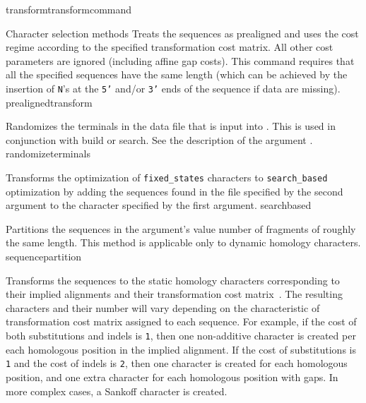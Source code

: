 \begin{command}{transform}{transformcommand}
\begin{arguments}
\begin{argumentgroup}{Character selection methods}
                {Treats the sequences as prealigned and uses the
                cost regime according to the specified transformation cost
                matrix. All other cost parameters are ignored (including affine
                gap costs). This command requires that all the specified sequences 
                have the same length (which can be achieved by the insertion of \texttt{N}'s
                at the \texttt{5'} and/or \texttt{3'} ends of the sequence if data are missing).}
                {prealignedtransform}
            
                {Randomizes the terminals in the data file that is input into \poy.  This is used in conjunction with 
                build or search. See the description of the argument .}
                {randomizeterminals}
        
                {Transforms the optimization of \texttt{fixed\_states} characters to \texttt{search\_based}
                optimization \cite{wheeler2003b} by adding the sequences found in the file specified by the second 
                argument to the character specified by the first argument.}
                {searchbased}
        
                {Partitions the sequences in the argument's value number of
                fragments of roughly the same length. This method is applicable only to dynamic homology characters.}
                {sequencepartition}

                {Transforms the sequences to the static homology characters
                corresponding to their implied alignments and their transformation
                cost matrix~\cite{wheeler2003}. The resulting characters and their number will vary
                depending on the characteristic of transformation cost matrix
                assigned to each sequence. For example, if the cost of both substitutions
                and indels is \texttt{1}, then one non-additive character is created per
                each homologous position in the implied alignment. If the cost of
                substitutions is \texttt{1} and the cost of indels  is \texttt{2}, then
                one character is created for each homologous position, and one extra character for
                each homologous position with gaps. In more complex cases, a Sankoff character is
                created.
                
}
\end{argumentgroup}
\end{arguments}
\end{command}

